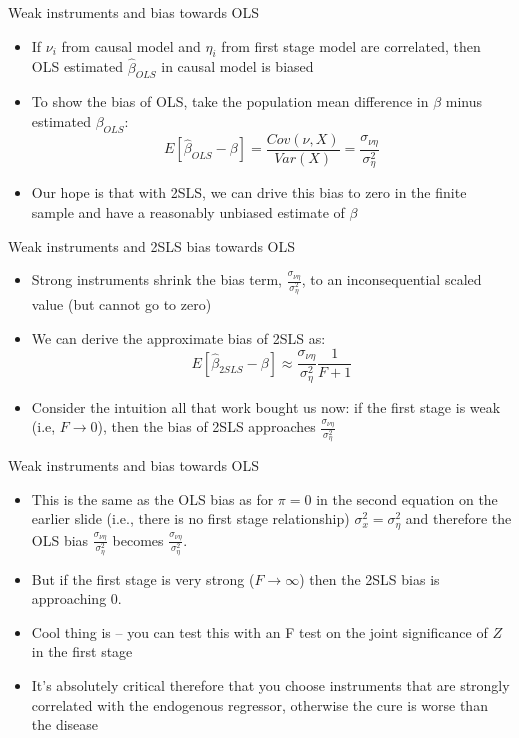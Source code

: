 \documentclass{beamer}
\begin{document}
\begin{frame}{Weak instruments and bias towards OLS}


\begin{itemize}
	\item If $\nu_i$ from causal model and $\eta_i$ from first stage model are correlated, then OLS estimated $\widehat{\beta}_{OLS}$ in causal model is biased
	\item To show the bias of OLS, take the population mean difference in $\beta$ minus estimated $\beta_{OLS}$: $$E[\widehat{\beta}_{OLS} - \beta] = \frac{ Cov(\nu, X)}{Var(X)} = \frac{\sigma_{\nu \eta}}{\sigma^2_\eta}$$
	\item Our hope is that with 2SLS, we can drive this bias to zero in the finite sample and have a reasonably unbiased estimate of $\beta$ 
\end{itemize}

\end{frame}


\begin{frame}{Weak instruments and 2SLS bias towards OLS}
	
	\begin{itemize}
	\item Strong instruments shrink the bias term, $\frac{\sigma_{\nu \eta}}{\sigma^2_\eta}$, to an inconsequential scaled value (but cannot go to zero)
	\item We can derive the approximate bias of 2SLS as:$$E[\widehat{\beta}_{2SLS} - \beta] \approx \frac{\sigma_{\nu \eta}}{\sigma^2_\eta} \frac{1}{F+1}$$
	\item Consider the intuition all that work bought us now: if the first stage is weak (i.e, $F\rightarrow{0}$), then the bias of 2SLS approaches $\frac{\sigma_{\nu \eta}}{\sigma^2_\eta}$
	\end{itemize}
\end{frame}

\begin{frame}{Weak instruments and bias towards OLS}

\begin{itemize}
	\item This is the same as the OLS bias as for $\pi=0$ in the second equation on the earlier slide (i.e., there is no first stage relationship) $\sigma^2_x = \sigma^2_\eta$ and therefore the OLS bias $\frac{\sigma_{\nu \eta}}{\sigma^2_\eta}$ becomes $\frac{\sigma_{\nu \eta}}{\sigma^2_\eta}$.
	\item But if the first stage is very strong ($F\rightarrow{\infty}$) then the 2SLS bias is approaching 0.
	\item Cool thing is -- you can test this with an F test on the joint significance of $Z$ in the first stage
	\item It's absolutely critical therefore that you choose instruments that are strongly correlated with the endogenous regressor, otherwise the cure is worse than the disease
\end{itemize}

\end{frame}
\end{document}
